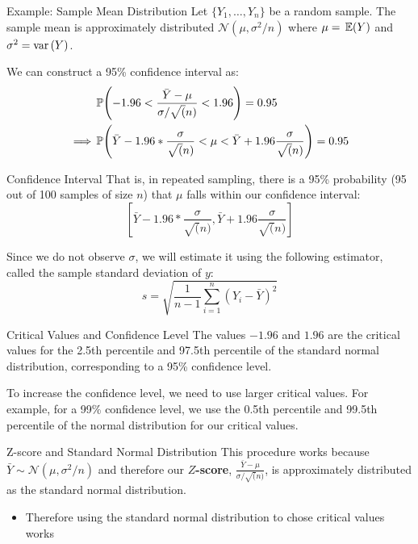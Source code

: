 \documentclass[aspectratio=169,t,11pt,table]{beamer}
\begin{document}
\begin{frame}{Example: Sample Mean Distribution}
  Let $\{ Y_1, \dots, Y_n \}$ be a random sample. The sample mean is approximately distributed $\mathcal{N}(\mu, \sigma^2 / n)$ where $\mu = \expec{Y}$ and $\sigma^2 = \var{Y}$. 

  \pause
  We can construct a 95\% confidence interval as: 
  \begin{align*}
    &\P{-1.96 < \frac{\bar{Y} - \mu}{\sigma / \sqrt(n)} < 1.96} = 0.95 \\
    \implies &\P{\bar{Y} - 1.96 * \frac{\sigma}{\sqrt(n)} < \mu  < \bar{Y} + 1.96 \frac{\sigma}{\sqrt(n)}} = 0.95
  \end{align*}
\end{frame}

\begin{frame}{Confidence Interval}
  That is, in repeated sampling, there is a 95\% probability (95 out of 100 samples of size $n$) that $\mu$ falls within our confidence interval: 
  $$
    \left[
      \bar{Y} - 1.96 * \frac{\sigma}{\sqrt(n)}, 
      \bar{Y} + 1.96 \frac{\sigma}{\sqrt(n)}
    \right]
  $$

  \pause
  \bigskip
  Since we do not observe $\sigma$, we will estimate it using the following estimator, called the sample standard deviation of $y$:
  $$
    s = \sqrt{\frac{1}{n-1} \sum_{i=1}^n (Y_i - \bar{Y})^2}
  $$
\end{frame}

\begin{frame}{Critical Values and Confidence Level}
  The values $-1.96$ and $1.96$ are the critical values for the 2.5th percentile and 97.5th percentile of the standard normal distribution, corresponding to a 95\% confidence level.

  \pause
  \bigskip
  To increase the confidence level, we need to use larger critical values. For example, for a 99\% confidence level, we use the 0.5th percentile and 99.5th percentile of the normal distribution for our critical values.
\end{frame}

\begin{frame}{Z-score and Standard Normal Distribution}
  This procedure works because $\bar{Y} \sim \mathcal{N}(\mu, \sigma^2/n)$ and therefore our \textbf{$Z$-score}, $\frac{\bar{Y} - \mu}{\sigma / \sqrt(n)}$, is approximately distributed as the standard normal distribution.
  \begin{itemize}
    \item Therefore using the standard normal distribution to chose critical values works
  \end{itemize}
\end{frame}
\end{document}
